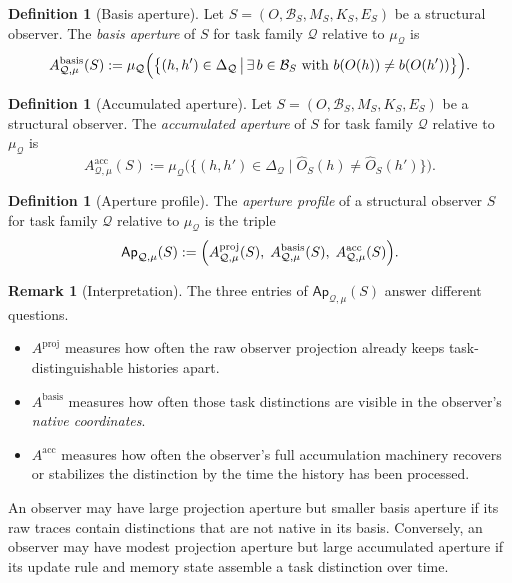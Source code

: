 \documentclass[11pt,twoside]{article}
\theoremstyle{definition}
\newtheorem{definition}[theorem]{Definition}
\newtheorem{remark}[theorem]{Remark}
\newcommand{\proj}{\mathrm{proj}}
\newcommand{\basis}{\mathrm{basis}}
\newcommand{\acc}{\mathrm{acc}}
\begin{document}
\begin{definition}[Basis aperture]
\label{def:basis-aperture}
Let \(S=(O,\mathcal{B}_S,M_S,K_S,E_S)\) be a structural observer. The \emph{basis aperture} of \(S\) for task family \(\mathcal{Q}\) relative to \(\mu_{\mathcal{Q}}\) is
\[
  A^{\basis}_{\mathcal{Q},\mu}(S)
  :=
  \mu_{\mathcal{Q}}
  \Bigl(
    \bigl\{
      (h,h')\in\Delta_{\mathcal{Q}}
      \,\big|\,
      \exists\, b\in\mathcal{B}_S \text{ with } b(O(h))\neq b(O(h'))
    \bigr\}
  \Bigr).
\]
\end{definition}

\begin{definition}[Accumulated aperture]
\label{def:accumulated-aperture}
Let \(S=(O,\mathcal{B}_S,M_S,K_S,E_S)\) be a structural observer. The \emph{accumulated aperture} of \(S\) for task family \(\mathcal{Q}\) relative to \(\mu_{\mathcal{Q}}\) is
\[
  A^{\acc}_{\mathcal{Q},\mu}(S)
  :=
  \mu_{\mathcal{Q}}
  \bigl(
    \{(h,h')\in\Delta_{\mathcal{Q}} \mid \widehat{O}_S(h)\neq \widehat{O}_S(h')\}
  \bigr).
\]
\end{definition}

\begin{definition}[Aperture profile]
\label{def:aperture-profile}
The \emph{aperture profile} of a structural observer \(S\) for task family \(\mathcal{Q}\) relative to \(\mu_{\mathcal{Q}}\) is the triple
\[
  \mathsf{Ap}_{\mathcal{Q},\mu}(S)
  :=
  \Bigl(
    A^{\proj}_{\mathcal{Q},\mu}(S),\;
    A^{\basis}_{\mathcal{Q},\mu}(S),\;
    A^{\acc}_{\mathcal{Q},\mu}(S)
  \Bigr).
\]
\end{definition}

\begin{remark}[Interpretation]
\label{rem:aperture-interpretation}
The three entries of \(\mathsf{Ap}_{\mathcal{Q},\mu}(S)\) answer different questions.
\begin{itemize}[leftmargin=*]
  \item \(A^{\proj}\) measures how often the raw observer projection already keeps task-distinguishable histories apart.
  \item \(A^{\basis}\) measures how often those task distinctions are visible in the observer's \emph{native coordinates}.
  \item \(A^{\acc}\) measures how often the observer's full accumulation machinery recovers or stabilizes the distinction by the time the history has been processed.
\end{itemize}
An observer may have large projection aperture but smaller basis aperture if its raw traces contain distinctions that are not native in its basis. Conversely, an observer may have modest projection aperture but large accumulated aperture if its update rule and memory state assemble a task distinction over time.
\end{remark}
\end{document}
